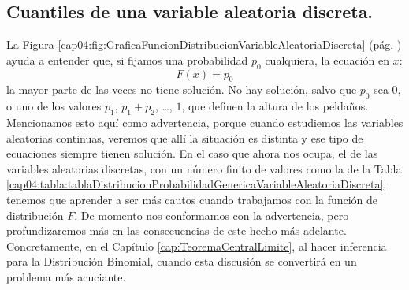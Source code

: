 \subsection{Cuantiles de una variable aleatoria discreta.}
\label{cap04:subsec:CuantilesVariableAleatoriaDiscreta}
La Figura \ref{cap04:fig:GraficaFuncionDistribucionVariableAleatoriaDiscreta} (pág. \pageref{cap04:fig:GraficaFuncionDistribucionVariableAleatoriaDiscreta}) ayuda a entender que, si fijamos una probabilidad $p_0$ cualquiera, la ecuación en $x$:
\[F(x)=p_0\]
la mayor parte de las veces no tiene solución. No hay solución, salvo que $p_0$ sea $0$, o uno de los valores $p_1$, $p_1+p_2$, \ldots, $1$, que definen la altura de los peldaños. Mencionamos esto aquí como advertencia,  porque cuando estudiemos las variables aleatorias continuas, veremos que allí la situación es distinta y ese tipo de ecuaciones siempre tienen solución. En el caso que ahora nos ocupa, el de las variables aleatorias discretas, con un número finito de valores como la de la Tabla \ref{cap04:tabla:tablaDistribucionProbabilidadGenericaVariableAleatoriaDiscreta}, tenemos que aprender a ser más cautos cuando trabajamos con la función de distribución $F$. De momento nos conformamos con la advertencia, pero profundizaremos más en las consecuencias de este hecho más adelante. Concretamente, en el Capítulo \ref{cap:TeoremaCentralLimite}, al hacer inferencia para la Distribución Binomial, cuando esta discusión se convertirá en un problema más acuciante.

